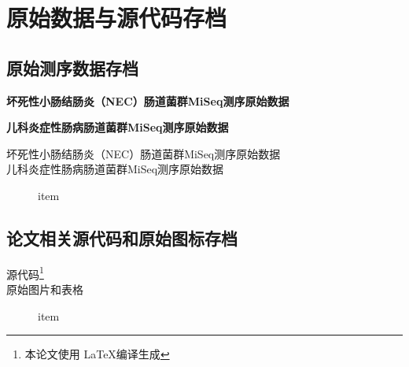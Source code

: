\chapter{原始数据与源代码存档}

\section{原始测序数据存档}
\textbf{坏死性小肠结肠炎（NEC）肠道菌群MiSeq测序原始数据}

\textbf{儿科炎症性肠病肠道菌群MiSeq测序原始数据}

\begin{description}
  \item[坏死性小肠结肠炎（NEC）肠道菌群MiSeq测序原始数据]
  \item[儿科炎症性肠病肠道菌群MiSeq测序原始数据] item
\end{description}


\section{论文相关源代码和原始图标存档}
\begin{description}

  \item[源代码\footnote{本论文使用 \LaTeX 编译生成}]
  \item[原始图片和表格] item
\end{description}
